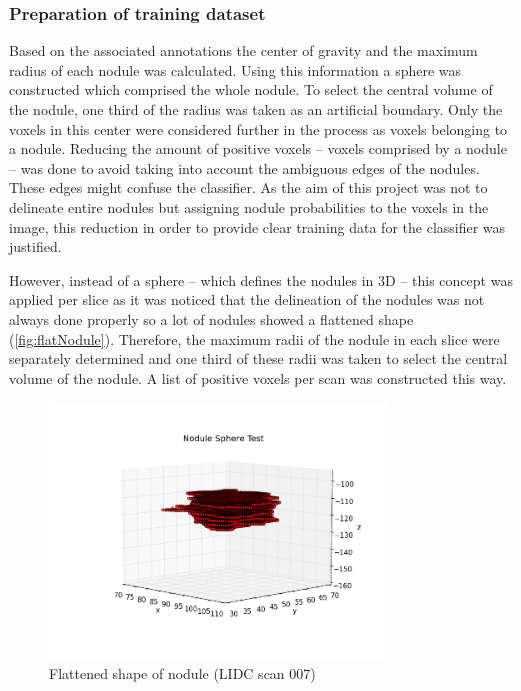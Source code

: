 \subsubsection{Preparation of training dataset}
Based on the associated annotations the center of gravity and the maximum radius
of each nodule was calculated. Using this information a sphere was constructed
which comprised the whole nodule. To select the central volume of the nodule,
one third of the radius was taken as an artificial boundary. Only the voxels in
this center were considered further in the process as voxels belonging to a
nodule. Reducing the amount of positive voxels -- voxels comprised by a nodule
-- was done to avoid taking into account the ambiguous edges of the nodules.
These edges might confuse the classifier. As the aim of this project was not to
delineate entire nodules but assigning nodule probabilities to the voxels in
the image, this reduction in order to provide clear training data for the
classifier was justified.

However, instead of a sphere -- which defines the nodules in 3D -- this concept
was applied per slice as it was noticed that the delineation of the nodules was
not always done properly so a lot of nodules showed a flattened shape
(\autoref{fig:flatNodule}).
Therefore, the maximum radii of the nodule in each slice were separately
determined and one third of these radii was taken to select the central volume
of the nodule. A list of positive voxels per scan was constructed this way.
\begin{figure}[htp]
 \begin{center}
    \includegraphics[width=90mm]{img/spherenodule_001.png}
    \caption{Flattened shape of nodule (LIDC scan 007)}
    \label{fig:flatNodule}
 \end{center}
\end{figure} %

